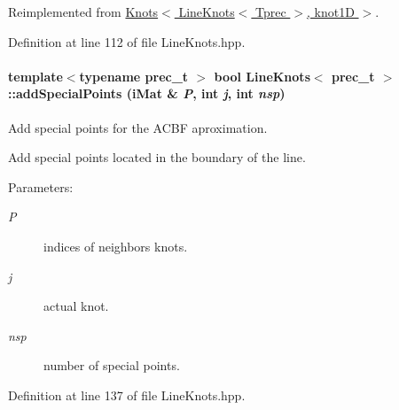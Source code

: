 Reimplemented from \hyperlink{classKnots_8e622932aee837d4c3465093f3158ebb}{Knots$<$ LineKnots$<$ Tprec $>$, knot1D $>$}.

Definition at line 112 of file LineKnots.hpp.\hypertarget{classLineKnots_d7bb406664501996f586473b5d61488e}{
\paragraph[{addSpecialPoints}]{\setlength{\rightskip}{0pt plus 5cm}template$<$typename prec\_\-t $>$ bool {\bf LineKnots}$<$ prec\_\-t $>$::addSpecialPoints ({\bf iMat} \& {\em P}, \/  int {\em j}, \/  int {\em nsp})}\hfill}
\label{classLineKnots_d7bb406664501996f586473b5d61488e}


Add special points for the ACBF aproximation. 

Add special points located in the boundary of the line.

\begin{Desc}
\item[Parameters:]
\begin{description}
\item[{\em P}]indices of neighbors knots. \item[{\em j}]actual knot. \item[{\em nsp}]number of special points. \end{description}
\end{Desc}


Definition at line 137 of file LineKnots.hpp.